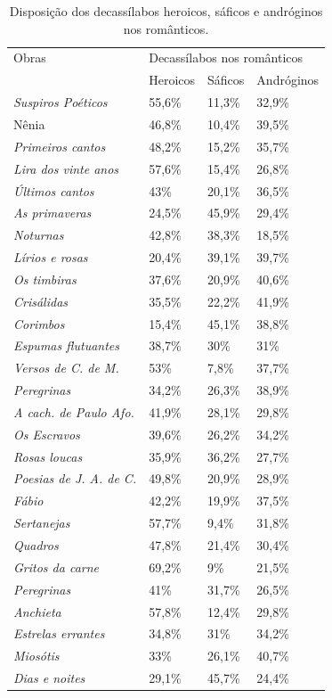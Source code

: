 \documentclass[portuguese]{textolivre}
\begin{document}
\begin{table}[!htbp]
\centering
\begin{threeparttable}
\caption{Disposição dos decassílabos heroicos, sáficos e andróginos nos românticos.}
\label{tbl2}
\begin{tabular}{llll}
\toprule
Obras & \multicolumn{3}{l}{Decassílabos nos românticos} \\
& Heroicos & Sáficos & Andróginos \\
\midrule
\textit{Suspiros Poéticos} &
55,6\% &
11,3\% &
32,9\% \\
Nênia &
46,8\% &
10,4\% &
39,5\% \\
\textit{Primeiros cantos} &
48,2\% &
15,2\% &
35,7\% \\
\textit{Lira dos vinte anos} &
57,6\% &
15,4\% &
26,8\% \\
\textit{Últimos cantos} &
43\% &
20,1\% &
36,5\% \\
\textit{As primaveras} &
24,5\% &
45,9\% &
29,4\% \\
\textit{Noturnas} &
42,8\% &
38,3\% &
18,5\% \\
\textit{Lírios e rosas} &
20,4\% & 
39,1\% &
39,7\% \\
\textit{Os timbiras} &
37,6\% &
20,9\% &
40,6\% \\
\textit{Crisálidas} &
35,5\% &
22,2\% &
41,9\% \\
\textit{Corimbos} &
15,4\% &
45,1\% &
38,8\% \\
\textit{Espumas flutuantes} &
38,7\% &
30\% &
31\% \\
\textit{Versos de C. de M.} &
53\% &
7,8\% &
37,7\% \\
\textit{Peregrinas} &
34,2\% &
26,3\% &
38,9\% \\
\textit{A cach. de Paulo Afo.} &
41,9\% &
28,1\% &
29,8\% \\
\textit{Os Escravos} &
39,6\% &
26,2\% &
34,2\% \\
\textit{Rosas loucas} &
35,9\% &
36,2\% &
27,7\% \\
\textit{Poesias de J. A. de C.} &
49,8\% &
20,9\% &
28,9\% \\
\textit{Fábio} &
42,2\% &
19,9\% &
37,5\% \\
\textit{Sertanejas} &
57,7\% &
9,4\% &
31,8\% \\
\textit{Quadros} &
47,8\% &
21,4\% &
30,4\% \\
\textit{Gritos da carne} &
69,2\% &
9\% &
21,5\% \\
\textit{Peregrinas} &
41\% &
31,7\% & 
26,5\% \\
\textit{Anchieta} &
57,8\% & 
12,4\% &
29,8\% \\
\textit{Estrelas errantes} &
34,8\% &
31\% &
34,2\% \\
\textit{Miosótis} &
33\% &
26,1\% &
40,7\% \\
\textit{Dias e noites} &
29,1\% &
45,7\% &
24,4\% \\
\bottomrule
\end{tabular}
\end{threeparttable}
\end{table}
\end{document}
